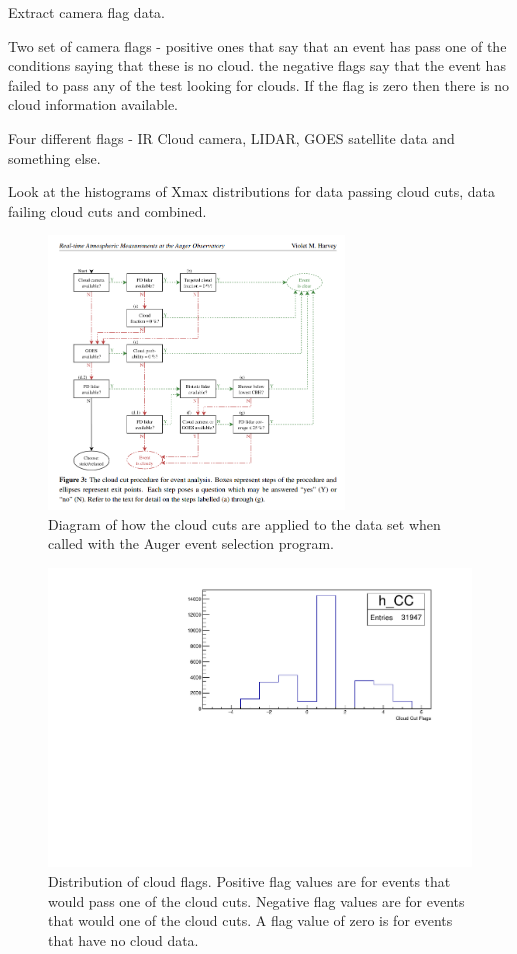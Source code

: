 Extract camera flag data.

Two set of camera flags - positive ones that say that an event has pass one of the conditions saying that these is no cloud. the negative flags say that the event has failed to pass any of the test looking for clouds. If the flag is zero then there is no cloud information available.

Four different flags - IR Cloud camera, LIDAR, GOES satellite data and something else.

Look at the histograms of Xmax distributions for data passing cloud cuts, data failing cloud cuts and combined.

\begin{figure}
\centering
\includegraphics[width=0.7\textwidth]{chapters/pictures/Violet_ICRC2019_CloudCut_Diagram.png}
\caption{Diagram of how the cloud cuts are applied to the data set when called with the Auger event selection program.}
\end{figure}

\begin{figure}
\centering
\includegraphics[width=\textwidth]{chapters/graphs/CloudFlags/hist_cloudFlags.pdf}
\caption{Distribution of cloud flags. Positive flag values are for events that would pass one of the cloud cuts. Negative flag values are for events that would one of the cloud cuts. A flag value of zero is for events that have no cloud data.}
\end{figure}

